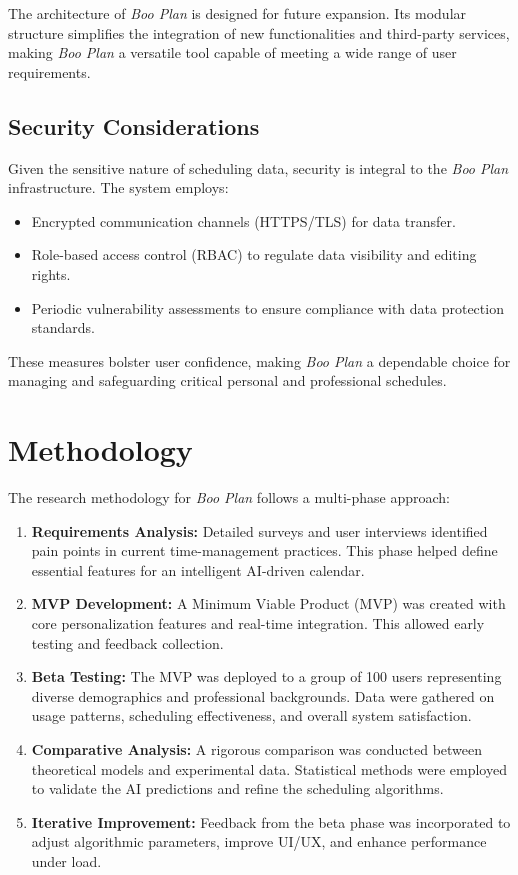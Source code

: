 \documentclass[14pt, english]{gost-7-32} %
\begin{document}
The architecture of \textit{Boo Plan} is designed for future expansion. Its modular structure simplifies the integration of new functionalities and third-party services, making \textit{Boo Plan} a versatile tool capable of meeting a wide range of user requirements.

\subsection{Security Considerations}

Given the sensitive nature of scheduling data, security is integral to the \textit{Boo Plan} infrastructure. The system employs:
\begin{itemize}
    \item Encrypted communication channels (HTTPS/TLS) for data transfer.
    \item Role-based access control (RBAC) to regulate data visibility and editing rights.
    \item Periodic vulnerability assessments to ensure compliance with data protection standards.
\end{itemize}

These measures bolster user confidence, making \textit{Boo Plan} a dependable choice for managing and safeguarding critical personal and professional schedules.

\section{Methodology}

The research methodology for \textit{Boo Plan} follows a multi-phase approach:

\begin{enumerate}
    \item \textbf{Requirements Analysis:} Detailed surveys and user interviews identified pain points in current time-management practices. This phase helped define essential features for an intelligent AI-driven calendar.
    \item \textbf{MVP Development:} A Minimum Viable Product (MVP) was created with core personalization features and real-time integration. This allowed early testing and feedback collection.
    \item \textbf{Beta Testing:} The MVP was deployed to a group of 100 users representing diverse demographics and professional backgrounds. Data were gathered on usage patterns, scheduling effectiveness, and overall system satisfaction.
    \item \textbf{Comparative Analysis:} A rigorous comparison was conducted between theoretical models and experimental data. Statistical methods were employed to validate the AI predictions and refine the scheduling algorithms.
    \item \textbf{Iterative Improvement:} Feedback from the beta phase was incorporated to adjust algorithmic parameters, improve UI/UX, and enhance performance under load.
\end{enumerate}
\end{document}
